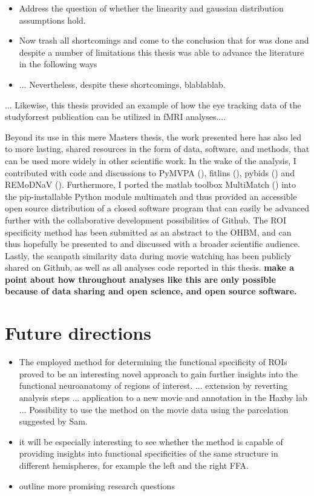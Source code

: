 \documentclass[a4paper, 12pt]{scrreprt}
\begin{document}
\begin{itemize}
 	\item Address the question of whether the linearity and gaussian distribution assumptions hold.
 	\item Now trash all shortcomings and come to the conclusion that for was done and despite a number of limitations this thesis was able to advance the literature in the following ways
 	\item 
 	
... Nevertheless, despite these shortcomings, blablablab. 
\end{itemize}
 
 \bigskip
... Likewise, this thesis provided an example of how the eye tracking data of the studyforrest publication can be utilized in fMRI analyses....
\bigskip
 
Beyond its use in this mere Masters thesis, the work presented here has also led to more lasting, shared resources in the form of data, software, and methods, that can be used more widely in other scientific work. In the wake of the analysis, I contributed with code and discussions to PyMVPA (\cite{hanke2009pymvpa}), fitlins (\cite{markiewicz_christopher_j_2019_2555453}), pybids (\cite{yarkoni_tal_2019_2555449}) and REMoDNaV (\cite{dar2019}). Furthermore, I ported the matlab toolbox MultiMatch (\cite{dewhurst2012depends}) into the pip-installable Python module multimatch and thus provided an accessible open source distribution of a closed software program that can easily be advanced further with the collaborative development possibilities of Github. The ROI specificity method has been submitted as an abstract to the OHBM, and can thus hopefully be presented to and discussed with a broader scientific audience. Lastly, the scanpath similarity data during movie watching has been publicly shared on Github, as well as all analyses code reported in this thesis. 
\textbf{make a point about how throughout analyses like this are only possible because of data sharing and open science, and open source software.}

	




\section{Future directions}
\begin{itemize}
	\item The employed method for determining the functional specificity of ROIs proved to be an interesting novel approach to gain further insights into the functional neuroanatomy of regions of interest. ... extension by reverting analysis steps ... application to a new movie and annotation in the Haxby lab ... Possibility to use the method on the movie data using the parcelation suggested by Sam. 
	\item it will be especially interesting to see whether the method is capable of providing insights into functional specificities of the same structure in different hemispheres, for example the left and the right FFA.
	\item outline more promising research questions 
\end{itemize}
\end{document}
